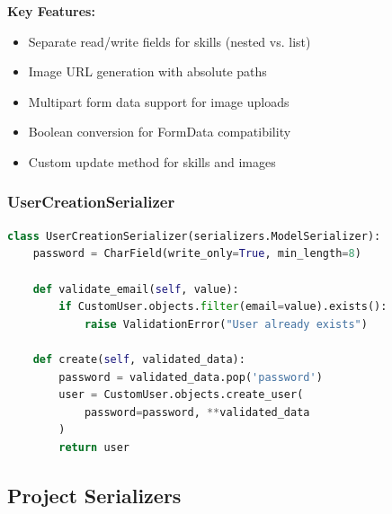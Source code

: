 \documentclass[11pt,a4paper]{article}
\begin{document}
\textbf{Key Features:}
\begin{itemize}[leftmargin=*]
    \item Separate read/write fields for skills (nested vs. list)
    \item Image URL generation with absolute paths
    \item Multipart form data support for image uploads
    \item Boolean conversion for FormData compatibility
    \item Custom update method for skills and images
\end{itemize}

\subsubsection{UserCreationSerializer}
\begin{lstlisting}[language=Python]
class UserCreationSerializer(serializers.ModelSerializer):
    password = CharField(write_only=True, min_length=8)
    
    def validate_email(self, value):
        if CustomUser.objects.filter(email=value).exists():
            raise ValidationError("User already exists")
    
    def create(self, validated_data):
        password = validated_data.pop('password')
        user = CustomUser.objects.create_user(
            password=password, **validated_data
        )
        return user
\end{lstlisting}

\subsection{Project Serializers}
\end{document}
